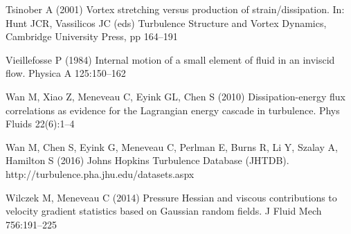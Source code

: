 \documentclass[preprint,amssymb,amsmath,aip,cha]{revtex4-1}
\begin{document}
\begin{thebibliography}{37}
{Tsinober} A (2001) Vortex stretching versus production of strain/dissipation.
  In: {Hunt} JCR, {Vassilicos} JC (eds) {Turbulence Structure and Vortex
  Dynamics}, Cambridge University Press, pp 164--191

{Vieillefosse} P (1984) Internal motion of a small element of fluid in an
  inviscid flow. Physica A 125:150--162

{Wan} M, {Xiao} Z, {Meneveau} C, {Eyink} GL, {Chen} S (2010) Dissipation-energy
  flux correlations as evidence for the {L}agrangian energy cascade in
  turbulence. Phys Fluids 22(6):1--4

{Wan} M, {Chen} S, {Eyink} G, {Meneveau} C, {Perlman} E, {Burns} R, {Li} Y,
  {Szalay} A, {Hamilton} S (2016) Johns {H}opkins {T}urbulence {D}atabase
  ({JHTDB}). http://turbulence.pha.jhu.edu/datasets.aspx

{Wilczek} M, {Meneveau} C (2014) Pressure {H}essian and viscous contributions
  to velocity gradient statistics based on {G}aussian random fields. J Fluid
  Mech 756:191--225

\end{thebibliography}
\end{document}
